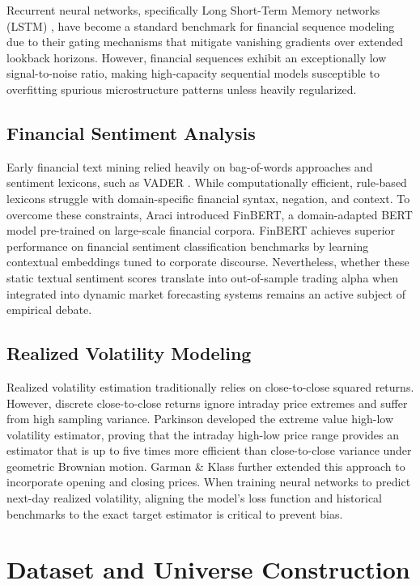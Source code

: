 \documentclass[10pt,journal,compsoc,twocolumn]{IEEEtran}
\begin{document}
Recurrent neural networks, specifically Long Short-Term Memory networks (LSTM) \cite{hochreiter1997lstm}, have become a standard benchmark for financial sequence modeling due to their gating mechanisms that mitigate vanishing gradients over extended lookback horizons. However, financial sequences exhibit an exceptionally low signal-to-noise ratio, making high-capacity sequential models susceptible to overfitting spurious microstructure patterns unless heavily regularized.

\subsection{Financial Sentiment Analysis}
Early financial text mining relied heavily on bag-of-words approaches and sentiment lexicons, such as VADER \cite{hutto2014vader}. While computationally efficient, rule-based lexicons struggle with domain-specific financial syntax, negation, and context. To overcome these constraints, Araci \cite{araci2019finbert} introduced FinBERT, a domain-adapted BERT model pre-trained on large-scale financial corpora. FinBERT achieves superior performance on financial sentiment classification benchmarks by learning contextual embeddings tuned to corporate discourse. Nevertheless, whether these static textual sentiment scores translate into out-of-sample trading alpha when integrated into dynamic market forecasting systems remains an active subject of empirical debate.

\subsection{Realized Volatility Modeling}
Realized volatility estimation traditionally relies on close-to-close squared returns. However, discrete close-to-close returns ignore intraday price extremes and suffer from high sampling variance. Parkinson \cite{parkinson1980extreme} developed the extreme value high-low volatility estimator, proving that the intraday high-low price range provides an estimator that is up to five times more efficient than close-to-close variance under geometric Brownian motion. Garman \& Klass \cite{garman1980estimation} further extended this approach to incorporate opening and closing prices. When training neural networks to predict next-day realized volatility, aligning the model's loss function and historical benchmarks to the exact target estimator is critical to prevent bias.

\section{Dataset and Universe Construction}
\end{document}
